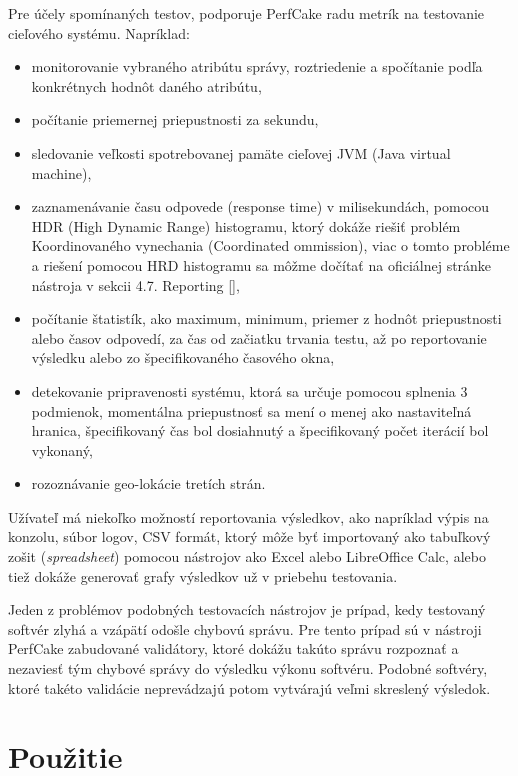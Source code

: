 Pre účely spomínaných testov, podporuje PerfCake radu metrík na testovanie cieľového systému. Napríklad:
\begin{itemize}
\item monitorovanie vybraného atribútu správy, roztriedenie a spočítanie podľa konkrétnych hodnôt daného atribútu,
\item počítanie priemernej priepustnosti za sekundu,
\item sledovanie veľkosti spotrebovanej pamäte cieľovej JVM (Java virtual machine),
\item zaznamenávanie času odpovede (response time) v milisekundách, pomocou HDR (High Dynamic Range) histogramu, ktorý dokáže riešiť problém Koordinovaného vynechania (Coordinated ommission), viac o tomto probléme a riešení pomocou HRD histogramu sa môžme dočítať na oficiálnej stránke nástroja v sekcii 4.7. Reporting [],
\item počítanie štatistík, ako maximum, minimum, priemer z hodnôt priepustnosti alebo časov odpovedí, za čas od začiatku trvania testu, až po reportovanie výsledku alebo zo špecifikovaného časového okna,
\item detekovanie pripravenosti systému, ktorá sa určuje pomocou splnenia 3 podmienok, momentálna priepustnosť sa mení o menej ako nastaviteľná hranica, špecifikovaný čas bol dosiahnutý a špecifikovaný počet iterácií bol vykonaný,
\item  rozoznávanie geo-lokácie tretích strán.
\end{itemize}

Užívateľ má niekoľko možností reportovania výsledkov, ako napríklad výpis na konzolu, súbor logov, CSV formát, ktorý môže byť importovaný ako tabuľkový zošit (\textit{spreadsheet}) pomocou nástrojov ako Excel alebo LibreOffice Calc, alebo tiež dokáže generovať grafy výsledkov už v priebehu testovania. 

Jeden z problémov podobných testovacích nástrojov je prípad, kedy testovaný softvér zlyhá a vzápätí odošle chybovú správu. Pre tento prípad sú v nástroji PerfCake zabudované validátory, ktoré dokážu takúto správu rozpoznať a nezaviesť tým chybové správy do výsledku výkonu softvéru. Podobné softvéry, ktoré takéto validácie neprevádzajú potom vytvárajú veľmi skreslený výsledok.

\section{Použitie}

